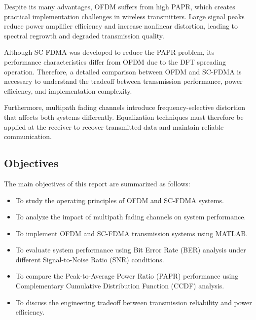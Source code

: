 Despite its many advantages, OFDM suffers from high PAPR, which creates
practical implementation challenges in wireless transmitters. Large signal
peaks reduce power amplifier efficiency and increase nonlinear distortion,
leading to spectral regrowth and degraded transmission quality.

Although SC-FDMA was developed to reduce the PAPR problem, its
performance characteristics differ from OFDM due to the DFT spreading
operation. Therefore, a detailed comparison between OFDM and SC-FDMA is
necessary to understand the tradeoff between transmission performance,
power efficiency, and implementation complexity.

Furthermore, multipath fading channels introduce frequency-selective
distortion that affects both systems differently. Equalization techniques
must therefore be applied at the receiver to recover transmitted data and
maintain reliable communication.

\subsection{Objectives}

The main objectives of this report are summarized as follows:

\begin{itemize}
    \item To study the operating principles of OFDM and SC-FDMA systems.
    
    \item To analyze the impact of multipath fading channels on system
    performance.
    
    \item To implement OFDM and SC-FDMA transmission systems using MATLAB.
    
    \item To evaluate system performance using Bit Error Rate (BER)
    analysis under different Signal-to-Noise Ratio (SNR) conditions.
    
    \item To compare the Peak-to-Average Power Ratio (PAPR) performance
    using Complementary Cumulative Distribution Function (CCDF)
    analysis.
    
    \item To discuss the engineering tradeoff between transmission
    reliability and power efficiency.
\end{itemize}

